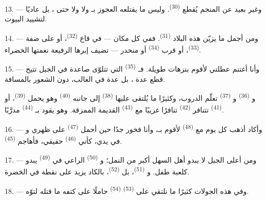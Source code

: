 13. --- وغير بعيد عن المنجم يُقطع  \textsuperscript{(30)}. وليس
ما يقتلعه  العجوز بـ  ولا
 ولا حتى ، بل  عاديًا
لتشييد البيوت.

14. --- ومن أجمل ما يزيّن هذه البلاد  \textsuperscript{(31)}.
ففي كل مكان --- في قاع  \textsuperscript{(32)}، أو على ضفة
 \textsuperscript{(33)}، أو قرب  \textsuperscript{(34)} أو
منحدر --- تضيف إبرها الرفيعة نغمتها الخضراء.

\VUsaut{3.0mm}
\VUsaut{3.0mm}

15. --- وأنا أغتنم عطلتي لأقوم بنزهات طويلة. فـ
\textsuperscript{(35)} التي تتلوّى صاعدة في الجبل تتيح قطع عدة
، بل عدة  في الغالب، دون الشعور بالمسافة.

و \textsuperscript{(36)} و
\textsuperscript{(37)} تعلّم الدروب، وكثيرًا ما يُلتقى عليها 
\textsuperscript{(38)} إلى جانبه  \textsuperscript{(40)} وهو يحمل
 \textsuperscript{(39)}، أو  \textsuperscript{(41)}
تتنافر  \textsuperscript{(42)} تنافرًا غريبًا مع
 \textsuperscript{(43)} القديمة الممزقة. وهو يقود
بـ  \textsuperscript{(44)} مدرَّبًا.

\VUsaut{3.0mm}

16. --- وأكاد أذهب كل يوم مع  \textsuperscript{(48)} لأقوم
بـ، وأنا فخور جدًا حين أحمل  \textsuperscript{(47)}
على ظهري و في يدي، كأني  \textsuperscript{(46)}
حقيقي، فأهاجم  \textsuperscript{(45)}.

17. --- ومن أعلى الجبل لا يبدو أهل السهل أكبر من النمل؛ و
\textsuperscript{(50)} الراعي في  \textsuperscript{(49)} يبدو
كلعبة طفل. و \textsuperscript{(51)}، بل 
\textsuperscript{(52)}، بالكاد يزيد على نقطة في الخضرة.

18. --- وفي هذه الجولات كثيرًا ما نلتقي على  \textsuperscript{(53)}
 \textsuperscript{(54)} حاملًا على كتفه ما قتله لتوّه.

